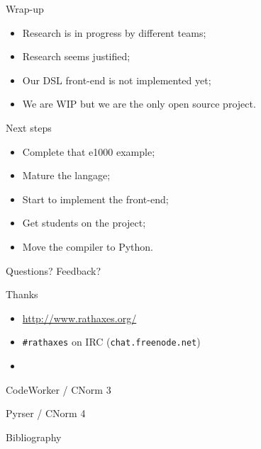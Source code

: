\documentclass[xcolor={usenames,svgnames}]{beamer}
\begin{document}
\begin{frame}{Wrap-up}
\Large{
\begin{itemize}
\item Research is in progress by different teams;
\item Research seems justified;
\item Our DSL front-end is not implemented yet;
\item We are WIP but we are the only open source project.
\end{itemize}
}
\end{frame}

\begin{frame}{Next steps}
\Large{
\begin{itemize}
\item Complete that e1000 example;
\item Mature the langage;
\item Start to implement the front-end;
\item Get students on the project;
\item Move the compiler to Python.
\end{itemize}
}
\end{frame}

\begin{frame}{Questions? Feedback?}
\begin{center}
\Huge{Thanks}

\end{center}
\vspace{2em}
\begin{itemize}
\item \Large{\url{http://www.rathaxes.org/}}
\item \Large{\texttt{\#rathaxes} on IRC (\texttt{chat.freenode.net})}
\item \Large{\twitter}
\end{itemize}
\end{frame}

\begin{frame}{CodeWorker / CNorm 3}
\end{frame}

\begin{frame}{Pyrser / CNorm 4}
\end{frame}

\begin{frame}{Bibliography}
\rtxbibliography
\end{frame}
\end{document}
